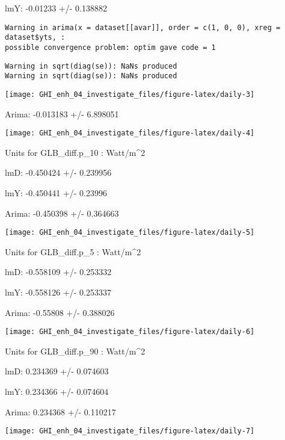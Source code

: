 \documentclass[
  10pt,
  a4paper,oneside]{article}
\begin{document}
lmY: -0.01233 +/- 0.138882

\begin{verbatim}
Warning in arima(x = dataset[[avar]], order = c(1, 0, 0), xreg = dataset$yts, :
possible convergence problem: optim gave code = 1
\end{verbatim}

\begin{verbatim}
Warning in sqrt(diag(se)): NaNs produced
Warning in sqrt(diag(se)): NaNs produced
\end{verbatim}

\begin{center}\texttt{[image: GHI\_enh\_04\_investigate\_files/figure-latex/daily-3]} \end{center}

Arima: -0.013183 +/- 6.898051

\begin{center}\texttt{[image: GHI\_enh\_04\_investigate\_files/figure-latex/daily-4]} \end{center}

Units for GLB\_diff.p\_10 : Watt/m\^{}2

lmD: -0.450424 +/- 0.239956

lmY: -0.450441 +/- 0.23996

Arima: -0.450398 +/- 0.364663

\begin{center}\texttt{[image: GHI\_enh\_04\_investigate\_files/figure-latex/daily-5]} \end{center}

Units for GLB\_diff.p\_5 : Watt/m\^{}2

lmD: -0.558109 +/- 0.253332

lmY: -0.558126 +/- 0.253337

Arima: -0.55808 +/- 0.388026

\begin{center}\texttt{[image: GHI\_enh\_04\_investigate\_files/figure-latex/daily-6]} \end{center}

Units for GLB\_diff.p\_90 : Watt/m\^{}2

lmD: 0.234369 +/- 0.074603

lmY: 0.234366 +/- 0.074604

Arima: 0.234368 +/- 0.110217

\begin{center}\texttt{[image: GHI\_enh\_04\_investigate\_files/figure-latex/daily-7]} \end{center}
\end{document}
